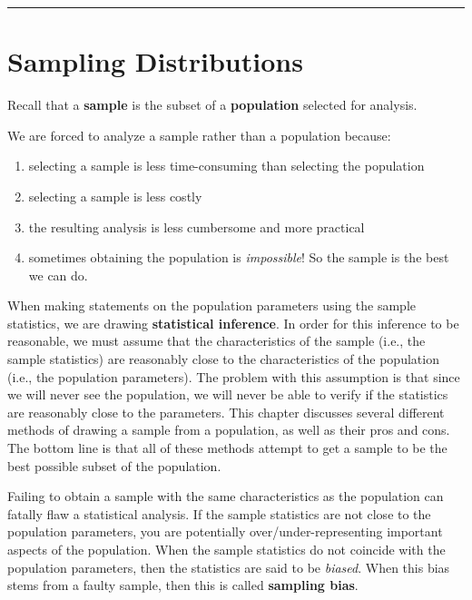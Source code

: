 \documentclass[
]{book}
\begin{document}
\begin{center}\rule{0.5\linewidth}{0.5pt}\end{center}

\section{Sampling Distributions}\label{sampling-distributions}

Recall that a \textbf{sample} is the subset of a \textbf{population} selected for analysis.

We are forced to analyze a sample rather than a population because:

\begin{enumerate}
\def\labelenumi{\arabic{enumi}.}
\item
  selecting a sample is less time-consuming than selecting the population
\item
  selecting a sample is less costly
\item
  the resulting analysis is less cumbersome and more practical
\item
  sometimes obtaining the population is \emph{impossible}! So the sample is the best we can do.
\end{enumerate}

When making statements on the population parameters using the sample statistics, we are drawing \textbf{statistical inference}. In order for this inference to be reasonable, we must assume that the characteristics of the sample (i.e., the sample statistics) are reasonably close to the characteristics of the population (i.e., the population parameters). The problem with this assumption is that since we will never see the population, we will never be able to verify if the statistics are reasonably close to the parameters. This chapter discusses several different methods of drawing a sample from a population, as well as their pros and cons. The bottom line is that all of these methods attempt to get a sample to be the best possible subset of the population.

Failing to obtain a sample with the same characteristics as the population can fatally flaw a statistical analysis. If the sample statistics are not close to the population parameters, you are potentially over/under-representing important aspects of the population. When the sample statistics do not coincide with the population parameters, then the statistics are said to be \emph{biased}. When this bias stems from a faulty sample, then this is called \textbf{sampling bias}.
\end{document}
